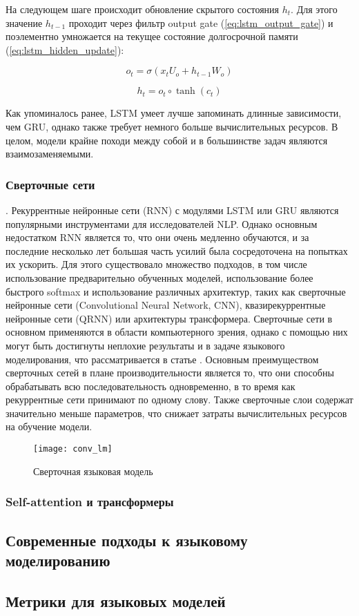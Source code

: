 На следующем шаге происходит обновление скрытого состояния $h_t$. Для этого значение $h_{t-1}$ проходит через фильтр output gate (\ref{eq:lstm_output_gate}) и поэлементно умножается на текущее состояние долгосрочной памяти (\ref{eq:lstm_hidden_update}):

\begin{equation}
	o_t = \sigma(x_tU_o + h_{t-1}W_o)
	\label{eq:lstm_output_gate}
\end{equation}

\begin{equation}
	h_t = o_t \circ \tanh{(c_t)}
	\label{eq:lstm_hidden_update}
\end{equation}

Как упоминалось ранее, LSTM умеет лучше запоминать длинные зависимости, чем GRU, однако также требует немного больше вычислительных ресурсов. В целом, модели крайне походи между собой и в большинстве задач являются взаимозаменяемыми.

\subsubsection{Сверточные сети}. Рекуррентные нейронные сети (RNN) с модулями LSTM или GRU являются популярными инструментами для исследователей NLP. Однако основным недостатком RNN является то, что они очень медленно обучаются, и за последние несколько лет большая часть усилий была сосредоточена на попытках их ускорить. Для этого существовало множество подходов, в том числе использование предварительно обученных моделей, использование более быстрого softmax и использование различных архитектур, таких как сверточные нейронные сети (Convolutional Neural Network, CNN), квазирекуррентные нейронные сети (QRNN) или архитектуры трансформера. Сверточные сети в основном применяются в области компьютерного зрения, однако с помощью них могут быть достигнуты неплохие результаты и в задаче языкового моделирования, что рассматривается в статье \cite{conv_lm_paper}. Основным преимуществом сверточных сетей в плане производительности является то, что они способны обрабатывать всю последовательность одновременно, в то время как рекуррентные сети принимают по одному слову. Также сверточные слои содержат значительно меньше параметров, что снижает затраты вычислительных ресурсов на обучение модели.


\begin{figure}[ht]
	\centering
	\texttt{[image: conv\_lm]}  
	\caption{ Сверточная языковая модель \cite{conv_lm_paper} }
	\label{fig:lstm}
\end{figure}


\subsubsection{Self-attention и трансформеры}

\subsection{Современные подходы к языковому моделированию}
\label{sub:domain:curr}

\subsection{Метрики для языковых моделей}


